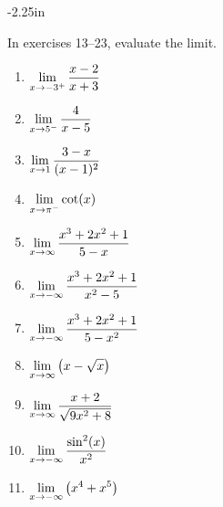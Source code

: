 \begin{adjustwidth*}{}{-2.25in}
\setlength{\columnsep}{25pt}
\begin{multicols*}{2}\small

In exercises 13--23, evaluate the limit.

\begin{multicols}{2}
\begin{enumerate}[1),start=13]
\item {$\displaystyle \lim_{x \to -3^+} \frac{x-2}{x+3}$}
\item {$\displaystyle \lim_{x \to 5^-} \frac{4}{x-5}$}
\item {$\displaystyle \lim_{x \to 1} \frac{3-x}{(x-1)^2}$}
\item {$\displaystyle \lim_{x \to \pi^-} \cot(x)$}
\item {$\displaystyle \lim_{x\to\infty} \frac{x^3+2x^2+1}{5-x}$}
\item {$\displaystyle \lim_{x\to-\infty} \frac{x^3+2x^2+1}{x^2-5}$}
\item {$\displaystyle \lim_{x\to-\infty} \frac{x^3+2x^2+1}{5-x^2}$}
\item {$\displaystyle \lim_{x \to \infty} \left( x - \sqrt{x} \right)$}
\item $\displaystyle \lim_{x \to \infty} \frac{x+2}{\sqrt{9x^2 + 8}}$
\item $\displaystyle \lim_{x \to -\infty} \frac{\sin^2(x)}{x^2}$
\item $\displaystyle \lim_{x \to -\infty} \left( x^4 + x^5 \right)$
\end{enumerate}
\end{multicols}

\vspace{.5cm}

\end{multicols*}
\end{adjustwidth*}
\afterexercises